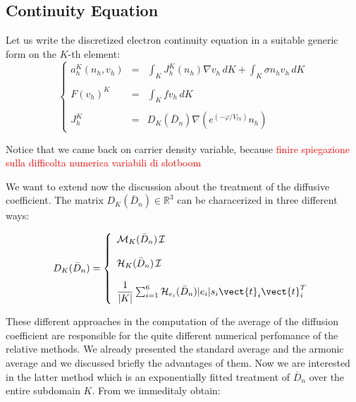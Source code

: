 \subsection{Continuity Equation}

Let us write the discretized electron continuity equation in a suitable generic form on the $K$-th element:
\begin{equation}
\label{eq: LEC discretized general}
\left\{
\begin{array}{rcl}
a_h^K(n_h,v_h) & = & \int_{K} J_h^K(n_h) \nabla v_h \, dK + \int_{K} \sigma n_h v_h \, dK 
\\
\\
F(v_h)^K & = & \int_K f v_h \, dK
\\
\\
J_h^K & = & D_K(\bar{D}_n) \nabla  (e^{(-\varphi / V_{th})}n_h)
\end{array}
\right.
\end{equation}

Notice that we came back on carrier density variable, because 
\textcolor{red}{finire spiegazione sulla difficolta numerica variabili di slotboom}

We want to extend now the discussion about the treatment of the diffusive coefficient. The matrix $D_K(\bar{D}_n) \in \mathbb{R}^3$ can be characerized in three different ways:

\begin{equation}
D_K(\bar{D}_n) = \left\{ 
\begin{array}{l}
\mathcal{M}_K(\bar{D}_n) \, \mathcal{I}
\\
\\
\mathcal{H}_K(\bar{D}_n) \, \mathcal{I}
\\
\\
 \dfrac{1}{|K|}\sum_{i=1}^6 \mathcal{H}_{e_i}(\bar{D}_n) |e_i| s_i \vect{t}_i \vect{t}_i^T
\end{array}
\right.
\end{equation} 

These different approaches in the computation of the average of the diffusion coefficient are responsible for the quite different numerical perfomance of the relative methods.
We already presented the standard average and the armonic average and we discussed briefly the advantages of them. 
Now we are interested in the latter method which  is an exponentially fitted treatment of $\bar{D}_n$ over the entire subdomain $K$. 
From  we immeditaly obtain:

